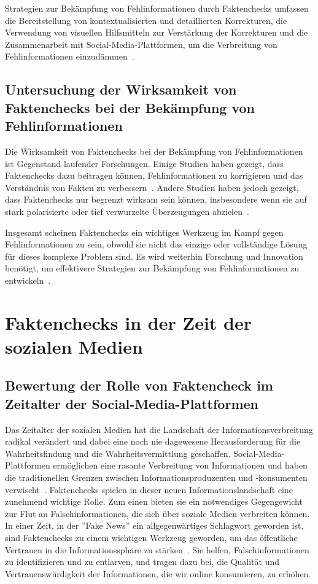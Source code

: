 \documentclass[a4paper,listof=totoc,bibliography=totoc]{scrartcl}
\begin{document}
Strategien zur Bekämpfung von Fehlinformationen durch Faktenchecks umfassen die Bereitstellung von kontextualisierten und detaillierten Korrekturen, die Verwendung 
von visuellen Hilfsmitteln zur Verstärkung der Korrekturen und die Zusammenarbeit mit Social-Media-Plattformen, um die Verbreitung von Fehlinformationen einzudämmen~\cite{lewandowsky2020}.

\subsection{Untersuchung der Wirksamkeit von Faktenchecks bei der Bekämpfung von Fehlinformationen}

Die Wirksamkeit von Faktenchecks bei der Bekämpfung von Fehlinformationen ist Gegenstand laufender Forschungen. Einige Studien haben gezeigt, dass Faktenchecks 
dazu beitragen können, Fehlinformationen zu korrigieren und das Verständnis von Fakten zu verbessern~\cite{amazeen2018}. Andere Studien haben jedoch gezeigt, dass Faktenchecks nur 
begrenzt wirksam sein können, insbesondere wenn sie auf stark polarisierte oder tief verwurzelte Überzeugungen abzielen~\cite{nyhan2010}.

Insgesamt scheinen Faktenchecks ein wichtiges Werkzeug im Kampf gegen Fehlinformationen zu sein, obwohl sie nicht das einzige oder vollständige Lösung für dieses 
komplexe Problem sind. Es wird weiterhin Forschung und Innovation benötigt, um effektivere Strategien zur Bekämpfung von Fehlinformationen zu entwickeln~\cite{lewandowsky2020}.

\section{Faktenchecks in der Zeit der sozialen Medien}

\subsection{Bewertung der Rolle von Faktencheck im Zeitalter der Social-Media-Plattformen}

Das Zeitalter der sozialen Medien hat die Landschaft der Informationsverbreitung radikal verändert und dabei eine noch nie dagewesene Herausforderung 
für die Wahrheitsfindung und die Wahrheitsvermittlung geschaffen. Social-Media-Plattformen ermöglichen eine rasante Verbreitung von Informationen und 
haben die traditionellen Grenzen zwischen Informationsproduzenten und -konsumenten verwischt~\cite{Vosoughi2018}. Faktenchecks spielen in dieser neuen 
Informationslandschaft eine zunehmend wichtige Rolle.
Zum einen bieten sie ein notwendiges Gegengewicht zur Flut an Falschinformationen, die sich über soziale Medien verbreiten können. In einer Zeit, in 
der ''Fake News'' ein allgegenwärtiges Schlagwort geworden ist, sind Faktenchecks zu einem wichtigen Werkzeug geworden, um das öffentliche Vertrauen 
in die Informationssphäre zu stärken~\cite{lewandowsky2020}. Sie helfen, Falschinformationen zu identifizieren und zu entlarven, und tragen dazu bei, 
die Qualität und Vertrauenswürdigkeit der Informationen, die wir online konsumieren, zu erhöhen.
\end{document}
